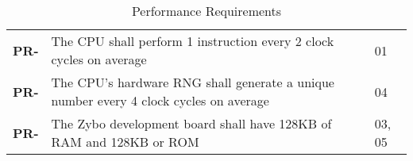 \resetfyshcounter
\newcommand{\pr}[2]{
	\textbf{PR-\rc} & #1 & #2 \\
	\hline
}
\begin{table}[H]
	\begin{tabularx}{\textwidth}{| a | x | a |}
		\hline
		 &  &  \\
		\hline
		\pr{The CPU shall perform 1 instruction every 2 clock cycles on average}%
		{01}

		\pr{The CPU's hardware RNG shall generate a unique number every 4 clock
			cycles on average}%
		{04}

		\pr{The Zybo development board shall have 128KB of RAM and 128KB or ROM}%
		{03, 05}
	\end{tabularx}
	\caption{Performance Requirements}
\end{table}

